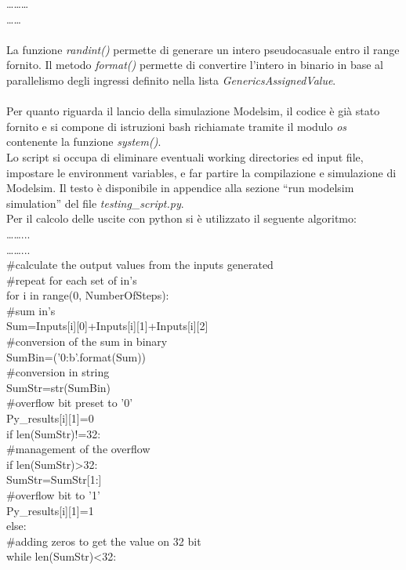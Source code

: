 \begin{itemize}
………\\
……\\
\\
La funzione \textit{randint()} permette di generare un intero pseudocasuale entro il range fornito.
Il metodo \textit{format()} permette di convertire l’intero in binario in base al parallelismo degli ingressi definito nella lista \textit{GenericsAssignedValue}.\\
\\
Per quanto riguarda il lancio della simulazione Modelsim, il codice è già stato fornito e si compone di istruzioni bash richiamate tramite il modulo \textit{os} contenente la funzione \textit{system()}.
\\
Lo script si occupa di eliminare eventuali working directories ed input file, impostare le environment variables, e far partire la compilazione e simulazione di Modelsim.
Il testo è disponibile in appendice alla sezione “run modelsim simulation” del file \textit{testing\_script.py}.
\\
Per il calcolo delle uscite con python si è utilizzato il seguente algoritmo:\\
……...\\
……...\\
#calculate the output values from the inputs generated\\
#repeat for each set of in's\\
for i in range(0, NumberOfSteps):\\  
#sum in's\\
Sum=Inputs[i][0]+Inputs[i][1]+Inputs[i][2]\\
#conversion of the sum in binary\\
SumBin=('{0:b}'.format(Sum))\\
#conversion in string \\
SumStr=str(SumBin)\\
#overflow bit preset to '0'\\
Py_results[i][1]=0 \\
if len(SumStr)!=32:\\
#management of the overflow\\
if len(SumStr)>32:    \\
SumStr=SumStr[1:]\\
#overflow bit to '1'\\
Py\_results[i][1]=1\\
else:\\
#adding zeros to get the value on 32 bit\\
while len(SumStr)<32:  \\

\end{itemize}
